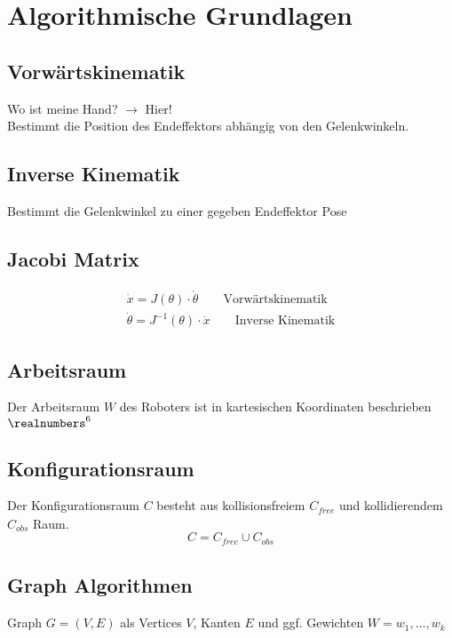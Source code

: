 

\section{Algorithmische Grundlagen}%
\label{ag:sec:algorithmtische_grundlagen}

\subsection{Vorwärtskinematik}%
\label{ag:sub:vorwaertskinematik}
Wo ist meine Hand? \(\rightarrow\) Hier!\\

Bestimmt die Position des Endeffektors abhängig von den Gelenkwinkeln.

\subsection{Inverse Kinematik}%
\label{ag:sub:inverse_kinematik}
Bestimmt die Gelenkwinkel zu einer gegeben Endeffektor Pose

\subsection{Jacobi Matrix}%
\label{ag:sub:jacobi_matrix}
\begin{align*}
  \dot{x} = J(\theta) \cdot \dot{\theta} \qquad \text{Vorwärtskinematik}\\
  \dot{\theta} = J^{-1} (\theta) \cdot \dot{x} \qquad \text{Inverse Kinematik}
\end{align*}

\subsection{Arbeitsraum}%
\label{ag:sub:arbeitsraum}
Der Arbeitsraum \(W\) des Roboters ist in kartesischen Koordinaten beschrieben \(\realnumbers^6\)

\subsection{Konfigurationsraum}%
\label{ag:sub:konfigurationsraum}
Der Konfigurationsraum \(C\) besteht aus kollisionsfreiem \(C_{\mathit{free}}\) und kollidierendem \(C_\mathit{obs}\) Raum.
\[C = C_\mathit{free} \cup C_\mathit{obs}\]

\subsection{Graph Algorithmen}%
\label{ag:sub:graph_algorithmen}
Graph \(G = (V, E)\) als Vertices \(V\), Kanten \(E\) und ggf. Gewichten \(W = {w_1, \ldots, w_k}\)

